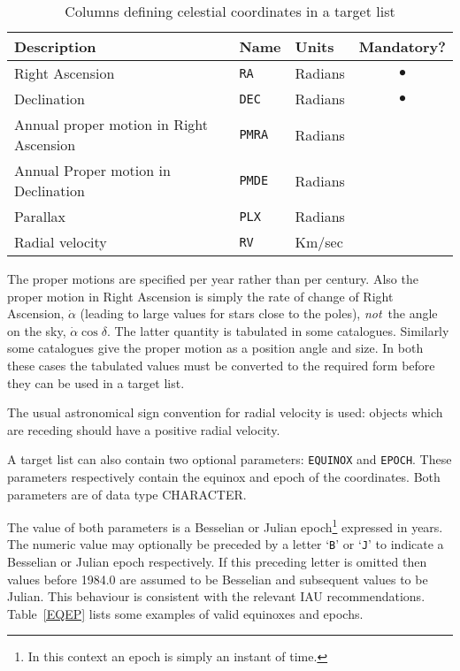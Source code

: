 \documentclass[twoside,11pt]{starlink}
\begin{document}
\begin{table}[htbp]

\begin{center}
\begin{tabular}{lllc}
Description                      & Name       & Units   & Mandatory? \\ \hline
Right Ascension                         & \texttt{RA}   & Radians & $\bullet$  \\
Declination                             & \texttt{DEC}  & Radians & $\bullet$  \\
Annual proper motion in Right Ascension & \texttt{PMRA} & Radians & \\
Annual Proper motion in Declination     & \texttt{PMDE} & Radians & \\
Parallax                                & \texttt{PLX}  & Radians & \\
Radial velocity                         & \texttt{RV}   & Km/sec  & \\
\end{tabular}

\caption{Columns defining celestial coordinates in a target list
\label{TARGETLIST} }
\end{center}

\end{table}

The proper motions are specified per year rather than per century.  Also
the proper motion in Right Ascension is simply the rate of change of
Right Ascension, $\dot{\alpha}$ (leading to large values for stars close
to the poles), \textit{not}\, the angle on the sky, $\dot{\alpha}\cos\delta$.
The latter quantity is tabulated in some catalogues.  Similarly some
catalogues give the proper motion as a position angle and size.
In both these cases the tabulated values must be converted to the
required form before they can be used in a target list.

The usual astronomical sign convention for radial velocity is used: objects
which are receding should have a positive radial velocity.

A target list can also contain two optional parameters: \texttt{EQUINOX}
and \texttt{EPOCH}.  These parameters respectively contain the equinox
and epoch of the coordinates.  Both parameters are of data type
CHARACTER.

The value of both parameters is a Besselian or Julian
epoch\footnote{In this context an epoch is simply an instant of
time.} expressed in years.  The numeric value may optionally be preceded
by a letter `\texttt{B}' or `\texttt{J}' to indicate a Besselian or Julian
epoch respectively.  If this preceding letter is omitted then values
before 1984.0 are assumed to be Besselian and subsequent values to be
Julian.  This behaviour is consistent with the relevant IAU
recommendations.  Table~\ref{EQEP} lists some examples of valid
equinoxes and epochs.
\end{document}

